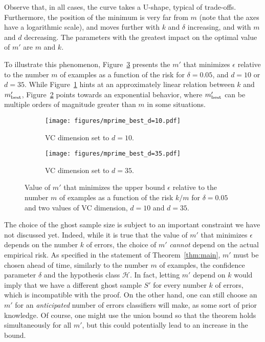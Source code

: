 \documentclass[twoside,11pt]{article}
\renewcommand{\H}{{\mathcal{H}}}
\begin{document}
Observe that, in all cases, the curve takes a U-shape, typical of trade-offs.
Furthermore, the position of the minimum is very far from $m$ (note that the axes have a logarithmic scale), and moves further with $k$ and $\delta$ increasing, and with $m$ and $d$ decreasing.
The parameters with the greatest impact on the optimal value of $m'$ are $m$ and $k$.

To illustrate this phenomenon, Figure~\ref{fig:mprime_best} presents the $m'$ that minimizes $\epsilon$ relative to the number $m$ of examples as a function of the risk for $\delta=0.05$, and $d=10$ or $d=35$.
While Figure~\ref{fig:mprime_best_d=10} hints at an approximately linear relation between $k$ and $m'_\textnormal{best}$, Figure~\ref{fig:mprime_best_d=35} points towards an exponential behavior, where $m'_\textnormal{best}$ can be multiple orders of magnitude greater than $m$ in some situations.

\begin{figure}[h!]
\centering
\begin{subfigure}[t]{0.485\textwidth}
    \centering
    \texttt{[image: figures/mprime\_best\_d=10.pdf]}
    \caption{VC dimension set to $d=10$.}
    \label{fig:mprime_best_d=10}
\end{subfigure}\hfill
\begin{subfigure}[t]{0.485\textwidth}
    \centering
    \texttt{[image: figures/mprime\_best\_d=35.pdf]}
    \caption{VC dimension set to $d=35$.}
    \label{fig:mprime_best_d=35}
\end{subfigure}
\caption{Value of $m'$ that minimizes the upper bound $\epsilon$ relative to the number $m$ of examples as a function of the risk $k/m$ for $\delta=0.05$ and two values of VC dimension, $d=10$ and $d=35$.}
\label{fig:mprime_best}
\end{figure}



The choice of the ghost sample size is subject to an important constraint we have not discussed yet.
Indeed, while it is true that the value of $m'$ that minimizes $\epsilon$ depends on the number $k$ of errors, the choice of $m'$ \emph{cannot} depend on the actual empirical risk.
As specified in the statement of Theorem~\ref{thm:main}, $m'$ must be chosen ahead of time, similarly to the number $m$ of examples, the confidence parameter $\delta$ and the hypothesis class $\H$.
In fact, letting $m'$ depend on $k$ would imply that we have a different ghost sample $S'$ for every number $k$ of errors, which is incompatible with the proof.
On the other hand, one can still choose an $m'$ for an \emph{anticipated} number of errors classifiers will make, as some sort of prior knowledge.
Of course, one might use the union bound so that the theorem holds simultaneously for all $m'$, but this could potentially lead to an increase in the bound. 
\end{document}
